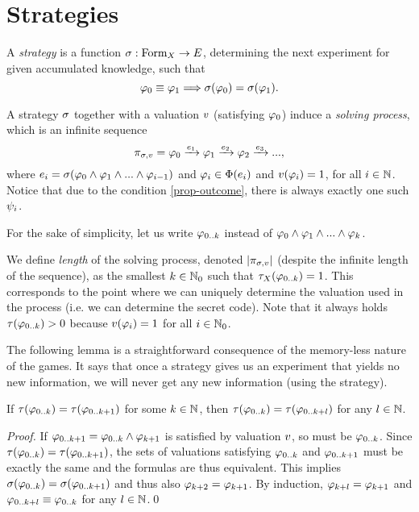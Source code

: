 \section{Strategies}

\begin{definition}
A \emph{strategy} is a function $\sigma: \textrm{Form}_X -> E$,
determining the next experiment for given accumulated knowledge,
such that
\[
\varphi_0 \equiv \varphi_1 ==> \sigma(\varphi_0) = \sigma(\varphi_1).
\]
\end{definition}

A strategy $\sigma$ together with a valuation $v$ (satisfying $\varphi_0$) induce
  a \emph{solving process}, which is an infinite sequence
\[
\pi_{\sigma,v} = \varphi_0 \xrightarrow{e_1} \varphi_1 \xrightarrow{e_2}
  \varphi_2 \xrightarrow{e_3} ...,
\]
where $e_i = \sigma(\varphi_0 \wedge \varphi_1 \wedge ... \wedge \varphi_{i-1})$ and
$\varphi_i \in \Phi(e_i)$ and $v(\varphi_i) = 1$,
for all $i\in\mathbb{N}$. Notice that due to the condition \ref{prop-outcome},
there is always exactly one such $\psi_i$.

For the sake of simplicity, let us write $\varphi_{0..k}$
instead of $\varphi_0 \wedge \varphi_1 \wedge ... \wedge \varphi_k$.

We define \emph{length} of the solving process,
  denoted $|\pi_{\sigma,v}|$
  (despite the infinite length of the sequence),
  as the smallest $k\in\mathbb{N}_0$ such that
  $\tau_X(\varphi_{0..k}) = 1$.
This corresponds to the point where we can uniquely
  determine the valuation used in the process
  (i.e. we can determine the secret code).
Note that it always holds $\tau(\varphi_{0..k}) > 0$ because
  $v(\varphi_i) = 1$ for all $i\in\mathbb{N}_0$.

The following lemma is a straightforward consequence
  of the memory-less nature of the games. It says that once a strategy
  gives us an experiment that yields no new information, we will never get
  any new information (using the strategy).

\begin{lemma}
If $\tau(\varphi_{0..k}) = \tau(\varphi_{0..k+1})$ for some $k\in\mathbb{N}$,
then $\tau(\varphi_{0..k}) = \tau(\varphi_{0..k+l})$ for any $l\in\mathbb{N}$.
\end{lemma}

\begin{proof}
If $\varphi_{0..k+1} = \varphi_{0..k} \wedge \varphi_{k+1}$
is satisfied by valuation $v$, so must be $\varphi_{0..k}$.
Since $\tau(\varphi_{0..k}) = \tau(\varphi_{0..k+1})$, the sets of
valuations satisfying $\varphi_{0..k}$ and $\varphi_{0..k+1}$ must be exactly the same
and the formulas are thus equivalent. This implies
$\sigma(\varphi_{0..k}) = \sigma(\varphi_{0..k+1})$ and thus also $\varphi_{k+2} = \varphi_{k+1}$.
By induction, $\varphi_{k+l} = \varphi_{k+1}$ and $\varphi_{0..k+l} \equiv \varphi_{0..k}$
 for any $l\in\mathbb{N}$.\qed
\end{proof}

